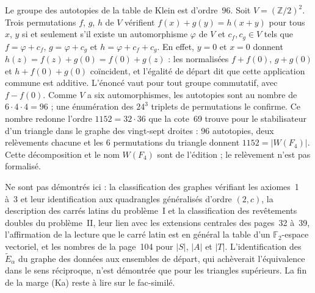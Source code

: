 \begin{remarque}
Le groupe des autotopies de la table de Klein est d'ordre~$96$. Soit $V = (\mathbb Z/2)^2$. Trois permutations $f$, $g$, $h$ de $V$ vérifient $f(x) + g(y) = h(x + y)$ pour tous $x$, $y$ si et seulement s'il existe un automorphisme $\varphi$ de $V$ et $c_f, c_g \in V$ tels que $f = \varphi + c_f$, $g = \varphi + c_g$ et $h = \varphi + c_f + c_g$. En effet, $y = 0$ et $x = 0$ donnent $h(z) = f(z) + g(0) = f(0) + g(z)$ : les normalisées $f + f(0)$, $g + g(0)$ et $h + f(0) + g(0)$ coïncident, et l'égalité de départ dit que cette application commune est additive. L'énoncé vaut pour tout groupe commutatif, avec $f - f(0)$. Comme $V$ a six automorphismes, les autotopies sont au nombre de $6 \cdot 4 \cdot 4 = 96$ ; une énumération des $24^3$ triplets de permutations le confirme. Ce nombre redonne l'ordre $1152 = 32 \cdot 36$ que la cote~69 trouve pour le stabilisateur d'un triangle dans le graphe des vingt-sept droites : $96$ autotopies, deux relèvements chacune et les $6$ permutations du triangle donnent $1152 = |W(F_4)|$. Cette décomposition et le nom $W(F_4)$ sont de l'édition ; le relèvement n'est pas formalisé.
\end{remarque}

Ne sont pas démontrés ici : la classification des graphes vérifiant les axiomes~1 à~3 et leur identification aux quadrangles généralisés d'ordre $(2, c)$, la description des carrés latins du problème~I et la classification des revêtements doubles du problème~II, leur lien avec les extensions centrales des pages~32 à~39, l'affirmation de la lecture que le carré latin est en général la table d'un $\mathbb F_2$-espace vectoriel, et les nombres de la page~104 pour $|S|$, $|A|$ et $|T|$. L'identification des $\widetilde E_\alpha$ du graphe des données aux ensembles de départ, qui achèverait l'équivalence dans le sens réciproque, n'est démontrée que pour les triangles supérieurs. La fin de la marge (Ka) reste à lire sur le fac-similé.
